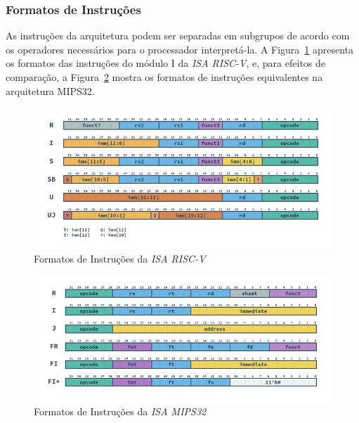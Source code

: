         \subsubsection{Formatos de Instruções}
        {
            As instruções da arquitetura podem ser separadas em subgrupos de acordo com
            os operadores necessários para o processador interpretá-la. A
            Figura~\ref{fig:riscv_formats} apresenta os formatos das instruções do
            módulo I da \textit{ISA RISC-V}, e, para efeitos de comparação, a
            Figura~\ref{fig:mips_formats} mostra os formatos de instruções equivalentes
            na arquitetura MIPS32.
        }

        \begin{figure}[H]
        \centering
            \includegraphics[width=1\linewidth]{../images/RV_Formats.png}
            \caption{Formatos de Instruções da \textit{ISA RISC-V}
                }\label{fig:riscv_formats}
        \end{figure}

        \begin{figure}[H]
        \centering
            \includegraphics[width=1\linewidth]{../images/MIPS_Formats.png}
            \caption{Formatos de Instruções da \textit{ISA MIPS32}
                }\label{fig:mips_formats}
        \end{figure}

